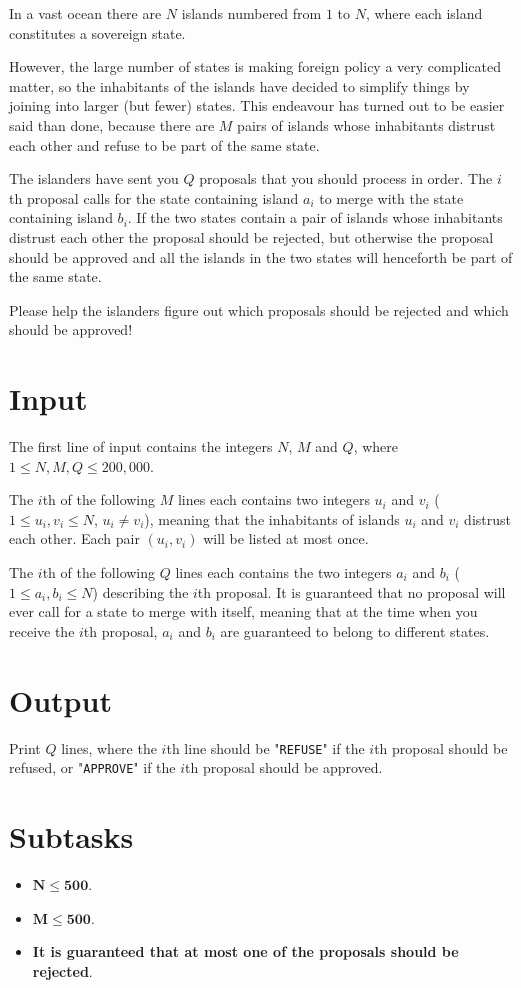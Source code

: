 In a vast ocean there are $N$ islands numbered from $1$ to $N$, where each
island constitutes a sovereign state.

However, the large number of states is making foreign policy a very complicated
matter, so the inhabitants of the islands have decided to simplify things by
joining into larger (but fewer) states. This endeavour has turned out to be
easier said than done, because there are $M$ pairs of islands whose inhabitants
distrust each other and refuse to be part of the same state.

The islanders have sent you $Q$ proposals that you should process in order. The
$i$th proposal calls for the state containing island $a_i$ to merge with the
state containing island $b_i$. If the two states contain a pair of islands
whose inhabitants distrust each other the proposal should be rejected, but
otherwise the proposal should be approved and all the islands in the two states
will henceforth be part of the same state.

Please help the islanders figure out which proposals should be rejected and
which should be approved!

\section*{Input}
The first line of input contains the integers $N$, $M$ and $Q$, where $1 \leq
N,M,Q \leq 200,000$.

The $i$th of the following $M$ lines each contains two integers $u_i$ and $v_i$
($1 \leq u_i,v_i \leq N$, $u_i \neq v_i$), meaning that the inhabitants of
islands $u_i$ and $v_i$ distrust each other. Each pair $(u_i, v_i)$ will be
listed at most once.

The $i$th of the following $Q$ lines each contains the two integers $a_i$ and
$b_i$ ($1 \leq a_i,b_i \leq N$) describing the $i$th proposal. It is guaranteed
that no proposal will ever call for a state to merge with itself, meaning that
at the time when you receive the $i$th proposal, $a_i$ and $b_i$ are guaranteed
to belong to different states.

\section*{Output}
Print $Q$ lines, where the $i$th line should be "\texttt{REFUSE}" if the $i$th
proposal should be refused, or "\texttt{APPROVE}" if the $i$th proposal should
be approved.

\section*{Subtasks}
\begin{itemize}
    \item $\mathbf{N} \mathbf{\leq} \mathbf{500}$.
    \item $\mathbf{M} \mathbf{\leq} \mathbf{500}$.
    \item \textbf{It is guaranteed that at most one of the proposals should be
    rejected}.
\end{itemize}

